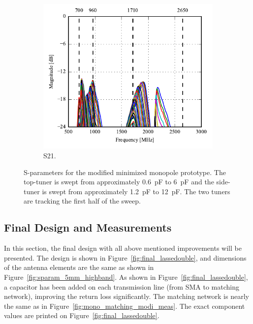\begin{figure}[htbp]
\begin{subfigure}{0.49\linewidth}
    \end{subfigure}
    \\
    \begin{subfigure}{0.49\linewidth}
        \includegraphics{img/tech_sol/monopole/highband/meas/tuner/S21.pdf}
        \caption{S21.}
    \end{subfigure}
    \caption{S-parameters for the modified minimized monopole prototype. The top-tuner is swept from approximately \SI{0.6}{pF} to \SI{6}{pF} and the side-tuner is swept from approximately \SI{1.2}{pF} to \SI{12}{pF}. The two tuners are tracking the first half of the sweep.}
    \label{fig:sparam_mono_modi_meas}
\end{figure}

\FloatBarrier
\subsection{Final Design and Measurements}
In this section, the final design with all above mentioned improvements will be presented. The design is shown in Figure~\ref{fig:final_lassedouble}, and dimensions of the antenna elements are the same as shown in Figure~\ref{fig:sparam_5mm_highband}. As shown in Figure~\ref{fig:final_lassedouble}, a capacitor has been added on each transmission line (from SMA to matching network), improving the return loss significantly. The matching network is nearly the same as in Figure~\ref{fig:mono_matching_modi_meas}. The exact component values are printed on Figure~\ref{fig:final_lassedouble}.

